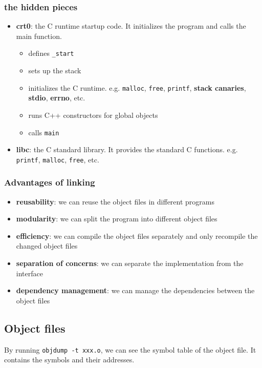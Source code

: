\documentclass[letterpaper,12pt]{article}
\begin{document}
\subsubsection{the hidden pieces}
\begin{itemize}
    \item \textbf{crt0}: the C runtime startup code. It initializes the program and calls the main function.\begin{itemize}
        \item defines \texttt{\_start}
        \item sets up the stack
        \item initializes the C runtime. e.g. \texttt{malloc}, \texttt{free}, \texttt{printf}, \textbf{stack canaries}, \textbf{stdio}, \textbf{errno}, etc.
        \item runs C++ constructors for global objects
        \item calls \texttt{main}
    \end{itemize}
    \item \textbf{libc}: the C standard library. It provides the standard C functions. e.g. \texttt{printf}, \texttt{malloc}, \texttt{free}, etc.
\end{itemize}
\subsubsection{Advantages of linking}
\begin{itemize}
    \item \textbf{reusability}: we can reuse the object files in different programs
    \item \textbf{modularity}: we can split the program into different object files
    \item \textbf{efficiency}: we can compile the object files separately and only recompile the changed object files
    \item \textbf{separation of concerns}: we can separate the implementation from the interface
    \item \textbf{dependency management}: we can manage the dependencies between the object files
\end{itemize}
\subsection{Object files}
By running \texttt{objdump -t xxx.o}, we can see the symbol table of the object file. It contains the symbols and their addresses.
\end{document}
